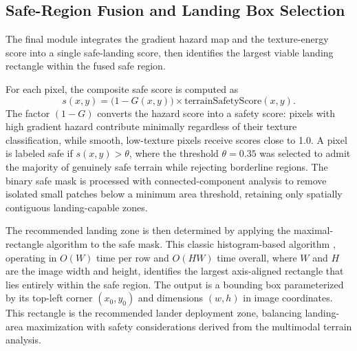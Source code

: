 \documentclass{article}
\begin{document}
\subsection{Safe-Region Fusion and Landing Box Selection}
The final module integrates the gradient hazard map and the texture-energy score into a single safe-landing score, then identifies the largest viable landing rectangle within the fused safe region.
 
For each pixel, the composite safe score is computed as
\begin{equation}
    s(x,y) = \bigl(1 - G(x,y)\bigr) \times \text{terrainSafetyScore}(x,y).
\end{equation}
The factor $(1-G)$ converts the hazard score into a safety score: pixels with high gradient hazard contribute minimally regardless of their texture classification, while smooth, low-texture pixels receive scores close to 1.0. A pixel is labeled safe if $s(x,y) > \theta$, where the threshold $\theta = 0.35$ was selected to admit the majority of genuinely safe terrain while rejecting borderline regions. The binary safe mask is processed with connected-component analysis to remove isolated small patches below a minimum area threshold, retaining only spatially contiguous landing-capable zones.
 
The recommended landing zone is then determined by applying the maximal-rectangle algorithm to the safe mask. This classic histogram-based algorithm \cite{vandevoorde1996maximal}, operating in $O(W)$ time per row and $O(HW)$ time overall, where $W$ and $H$ are the image width and height, identifies the largest axis-aligned rectangle that lies entirely within the safe region. The output is a bounding box parameterized by its top-left corner $(x_0, y_0)$ and dimensions $(w, h)$ in image coordinates. This rectangle is the recommended lander deployment zone, balancing landing-area maximization with safety considerations derived from the multimodal terrain analysis.
\end{document}
